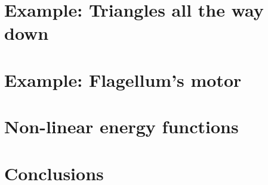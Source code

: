 %
%


\section{Example: Triangles all the way down}
\label{sec:triangles}





\section{Example: Flagellum's motor}
\label{sec:alloring}


\section{Non-linear energy functions}
\label{sec:non-linear-energy}


\section{Conclusions}
\label{sec:direct-conclusions}




